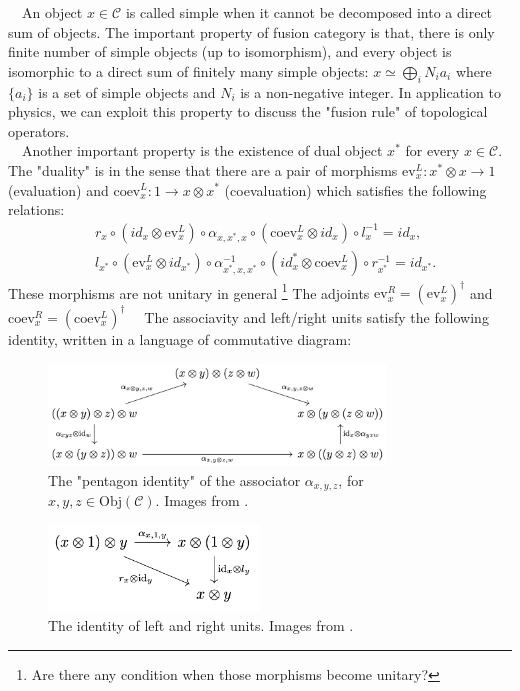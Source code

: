 \documentclass{ltjsarticle}
\theoremstyle{mystyle} %
\numberwithin{equation}{section}
\begin{document}
　An object $x\in \mathcal{C}$ is called simple when it cannot be decomposed into a direct sum of objects. 
The important property of fusion category is that, 
there is only finite number of simple objects (up to isomorphism), and 
every object is isomorphic to a direct sum of finitely many simple objects: 
$x\simeq \bigoplus_{i}N_i a_i$ where $\{a_i\}$ is a set of simple objects and $N_i$ is a non-negative integer. 
In application to physics, we can exploit this property to discuss the "fusion rule" of topological operators. \\
　Another important property is the existence of dual object $x^*$ for every $x\in \mathcal{C}$. 
The "duality" is in the sense that there are a pair of morphisms 
$\mathrm{ev}^{L}_x: x^*\otimes x \to 1$ (evaluation) and $\mathrm{coev}^{L}_x: 1\to x\otimes x^*$ (coevaluation) which satisfies the following relations: 
\begin{align}
    &r_x\circ (id_x\otimes \mathrm{ev}^L_x)\circ \alpha_{x, x^*, x}\circ (\mathrm{coev}^L_x\otimes id_x)\circ l^{-1}_x = id_x, \\
    &l_{x^*}\circ(\mathrm{ev}^L_x\otimes id_{x^{*}}) \circ \alpha^{-1}_{x^*, x, x^*}\circ (id_x^*\otimes \mathrm{coev}^{L}_x)\circ r^{-1}_{x^*}=id_{x^*}. 
    \label{eval}
\end{align}
These morphisms are not unitary in general
\footnote{Are there any condition when those morphisms become unitary? }
The adjoints $\mathrm{ev}^R_x = (\mathrm{ev}^{L}_x)^\dagger$ and $\mathrm{coev}^{R}_x = (\mathrm{coev}^{L}_x)^\dagger$ 
　The associavity and left/right units satisfy the following identity, written in a language of commutative diagram: 
\begin{figure}[H]
    \centering
    \includegraphics[width=0.8\textwidth]{pentagon.png}
    \caption{The "pentagon identity" of the associator $\alpha_{x,y,z}$, for $x,y,z\in \mathrm{Obj}(\mathcal{C})$. 
    Images from \cite{KI}. }
    \label{pentagon}
\end{figure}
\begin{figure}[H]
    \centering
    \includegraphics[width=0.5\textwidth]{lrunits.png}
    \caption{The identity of left and right units. 
    Images from \cite{KI}. }
    \label{lrunits}
\end{figure}
\end{document}
